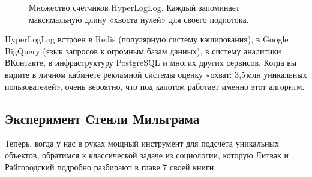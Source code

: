 \begin{figure}[H]
\centering
{}
\caption{Множество счётчиков HyperLogLog. Каждый запоминает максимальную длину «хвоста нулей» для своего подпотока.}
\label{fig:p6-2}
\end{figure}

\begin{interestbox}[title={Это интересно: где работает HyperLogLog}]
HyperLogLog встроен в Redis (популярную систему кэширования), в Google BigQuery (язык запросов к огромным базам данных), в систему аналитики ВКонтакте, в инфраструктуру PostgreSQL и многих других сервисов. Когда вы видите в личном кабинете рекламной системы оценку «охват: 3{,}5\,млн уникальных пользователей», очень вероятно, что под капотом работает именно этот алгоритм.
\end{interestbox}

\subsection{Эксперимент Стенли Мильграма}
\label{subsec:milgram}

Теперь, когда у нас в руках мощный инструмент для подсчёта уникальных объектов, обратимся к классической задаче из социологии, которую Литвак и Райгородский подробно разбирают в главе 7 своей книги.

